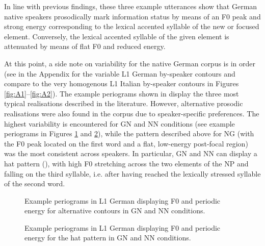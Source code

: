 In line with previous findings, these three example utterances show that German native speakers prosodically mark information status by means of an F0 peak and strong energy corresponding to the lexical accented syllable of the new or focused element. Conversely, the lexical accented syllable of the given element is attenuated by means of flat F0 and reduced energy.

At this point, a side note on variability for the native German corpus is in order (see  in the Appendix for the variable L1 German by-speaker contours and compare to the very homogenous L1 Italian by-speaker contours in Figures \ref{fig:A1}--\ref{fig:A2}). The example periograms shown in  display the three most typical realisations described in the literature. However, alternative prosodic realisations were also found in the corpus due to speaker-specific preferences. The highest variability is encountered for GN and NN conditions (see example periograms in Figures \ref{fig:2.12} and \ref{fig:2.13}), while the pattern described above for NG (with the F0 peak located on the first word and a flat, low-energy post-focal region) was the most consistent across speakers. In particular, GN and NN can display a hat pattern (), with high F0 stretching across the two elements of the NP and falling on the third syllable, i.e. after having reached the lexically stressed syllable of the second word.

\begin{figure}



\caption{Example periograms in L1 German displaying F0 and periodic energy for alternative contours in GN and NN conditions.}
\label{fig:2.12}
\end{figure}

\begin{figure}


\caption{Example periograms in L1 German displaying F0 and periodic energy for the hat pattern in GN and NN conditions.}
\label{fig:2.13}
\end{figure}

